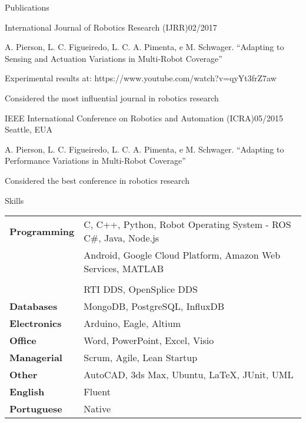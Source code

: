 \documentclass[14pt, a4paper]{resume} %
\begin{document}
\begin{rSection}{Publications}
\begin{rSubsection}{International Journal of Robotics Research (IJRR)}{02/2017}{}{}
	
\item A. Pierson, L. C. Figueiredo, L. C. A. Pimenta, e M. Schwager. ``Adapting to Sensing and Actuation Variations in Multi-Robot Coverage''
\item Experimental results at: https://www.youtube.com/watch?v=qyYt3frZ7aw
\item Considered the most influential journal in robotics research
\end{rSubsection}

\begin{rSubsection}{IEEE International Conference on Robotics and Automation (ICRA)}{05/2015}{}{ \normalfont Seattle, EUA}

\item A. Pierson, L. C. Figueiredo, L. C. A. Pimenta, e M. Schwager. ``Adapting to Performance Variations in Multi-Robot Coverage''
\item Considered the best conference in robotics research

\end{rSubsection}

\end{rSection}


\begin{rSection}{Skills}

\begin{tabular}{ @{} >{\bfseries}l @{\hspace{6ex}} l }
Programming & C, C++, Python, Robot Operating System - ROS C\#, Java, Node.js
\\ & Android, Google Cloud Platform, Amazon Web Services, MATLAB \\
\\ & RTI DDS, OpenSplice DDS \\
Databases & MongoDB, PostgreSQL, InfluxDB \\
Electronics & Arduino, Eagle, Altium \\
Office & Word, PowerPoint, Excel, Visio \\
Managerial & Scrum, Agile, Lean Startup \\
Other & AutoCAD, 3ds Max, Ubuntu, LaTeX, JUnit, UML\\
English & Fluent \\
Portuguese & Native
\end{tabular}

\end{rSection}
\end{document}
